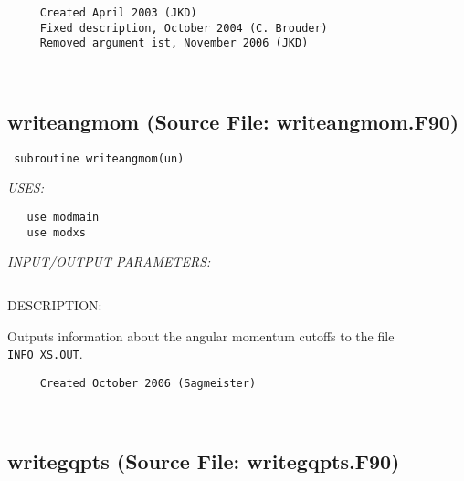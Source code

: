 \documentclass[11pt]{article}
\begin{document}
  
\begin{verbatim}     Created April 2003 (JKD)
     Fixed description, October 2004 (C. Brouder)
     Removed argument ist, November 2006 (JKD)\end{verbatim}


 
 
\mbox{}\hrulefill\ 
 
\subsection{writeangmom (Source File: writeangmom.F90)}


\begin{verbatim} subroutine writeangmom(un)\end{verbatim}{\em USES:}
\begin{verbatim}   use modmain
   use modxs\end{verbatim}{\em INPUT/OUTPUT PARAMETERS:}
\begin{verbatim} \end{verbatim}
{\sf DESCRIPTION:\\ }

    Outputs information about the angular momentum cutoffs to the file
     {\tt INFO\_XS.OUT}.
  
\begin{verbatim}     Created October 2006 (Sagmeister)\end{verbatim}










 
 
\mbox{}\hrulefill\ 
 
\subsection{writegqpts (Source File: writegqpts.F90)}
\end{document}
